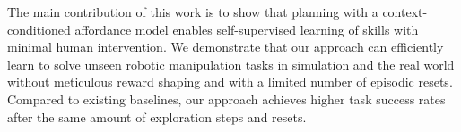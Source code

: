 The main contribution of this work is to show that planning with a  context-conditioned affordance model
enables self-supervised learning of skills with minimal human intervention.
We demonstrate that our approach can efficiently learn to solve unseen
robotic manipulation tasks in simulation and the real world without meticulous reward shaping and with a limited number of episodic resets.
Compared to existing baselines, our approach achieves higher task success rates after the same amount of exploration steps and resets.

